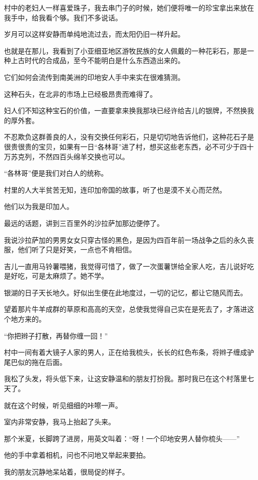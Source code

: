 \par 村中的老妇人一样喜爱珠子，我去串门子的时候，她们便将唯一的珍宝拿出来放在我手中，给我看个够。我们不多说话。
\par 岁月可以这样安静而单纯地流过去，而太阳仍旧一样升起。
\par 也就是在那儿，我看到了小亚细亚地区游牧民族的女人佩戴的一种花彩石，那是一种上古时代的合成品，至今不能明白是什么东西造出来的。
\par 它们如何会流传到南美洲的印地安人手中来实在很难猜测。
\par 这种石头，在北非的市场上已经极昂贵而难得了。
\par 妇人们不知这种宝石的价值，一直要拿来换我那块已经许给吉儿的银牌，不然换我的厚外套。
\par 不忍欺负这群善良的人，没有交换任何彩石，只是切切地告诉他们，这种花石子是很贵很贵的宝贝，如果有一日“各林哥”进了村，想买这些老东西，必不可少于四十万苏克列，不然四百头绵羊交换也可以。
\par “各林哥”便是我们对白人的统称。
\par 村里的人大半贫苦无知，连印加帝国的故事，听了也是漠不关心而茫然。
\par 他们以为我是印加人。
\par 最远的话题，讲到三百里外的沙拉萨加那边便停了。
\par 我说沙拉萨加的男男女女只穿古怪的黑色，是因为四百年前一场战争之后的永久丧服，他们听了只是好笑，一点也不肯相信。
\par 吉儿一直用马铃薯喂猪，我觉得可惜了，做了一次蛋薯饼给全家人吃，吉儿说好吃是好吃，可是太麻烦了。她不学。
\par 银湖的日子天长地久。好似出生便在此地度过，一切的记忆，都让它随风而去。
\par 望着那片牛羊成群的草原和高高的天空，总使我觉得自己实在是死去了，才落进这个地方来的。
\par “你把辫子打散，再替你缠一回！”
\par 村中一间有着大镜子人家的男人，正在给我梳头，长长的红色布条，将辫子缠成驴尾巴似的拖在后面。
\par 我松了头发，将头低下来，让这安静温和的朋友打扮我。那时我已在这个村落里七天了。
\par 就在这个时候，听见细细的咔嚓一声。
\par 室内非常安静，我马上抬起了头来。
\par 那个米夏，长脚跨了进房，用英文叫着：“呀！一个印地安男人替你梳头——”
\par 他的手中拿着相机，问也不问地又举起来要拍。
\par 我的朋友沉静地呆站着，很局促的样子。
